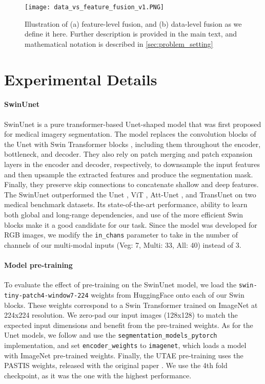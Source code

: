 \clearpage
\setcounter{page}{1}
\maketitlesupplementary

\begin{figure}
    \centering
    \texttt{[image: data\_vs\_feature\_fusion\_v1.PNG]}
    \caption{Illustration of (a) feature-level fusion, and (b) data-level fusion as we define it here. Further description is provided in the main text, and mathematical notation is described in \cref{sec:problem_setting}}
    \label{fig:data_vs_feature_fusion}
\end{figure}


\section{Experimental Details}
\paragraph{SwinUnet} SwinUnet \cite{cao2022swin} is a pure transformer-based Unet-shaped model that was first proposed for medical imagery segmentation. The model replaces the convolution blocks of the Unet with Swin Transformer blocks \cite{liu2021swin}, including them throughout the encoder, bottleneck, and decoder. They also rely on patch merging and patch expansion layers in the encoder and decoder, respectively, to downsample the input features and then upsample the extracted features and produce the segmentation mask. Finally, they preserve skip connections to concatenate shallow and deep features. The SwinUnet outperformed the Unet \cite{ronneberger2015u}, ViT \cite{chen2021transunet}, Att-Unet \cite{oktay2018attention}, and TransUnet \cite{chen2021transunet} on two medical benchmark datasets. Its state-of-the-art performance, ability to learn both global and long-range dependencies, and use of the more efficient Swin blocks make it a good candidate for our task. Since the model was developed for RGB images, we modify the \texttt{in\_chans} parameter to take in the number of channels of our multi-modal inputs (Veg: 7, Multi: 33, All: 40) instead of 3.   

\paragraph{Model pre-training} To evaluate the effect of pre-training on the SwinUnet model, we load the \texttt{swin-tiny-patch4-window7-224} weights from HuggingFace onto each of our Swin blocks. These weights correspond to a Swin Transformer trained on ImageNet at 224x224 resolution. We zero-pad our input images (128x128) to match the expected input dimensions and benefit from the pre-trained weights. As for the Unet models, we follow \cite{gerard2023wildfirespreadts} and use the \texttt{segmentation\_models\_pytorch} implementation, and set \texttt{encoder\_weights} to \texttt{imagenet}, which loads a model with ImageNet pre-trained weights. Finally, the UTAE pre-training uses the PASTIS weights, released with the original paper \cite{garnot2021panoptic}. We use the 4th fold checkpoint, as it was the one with the highest performance. 


